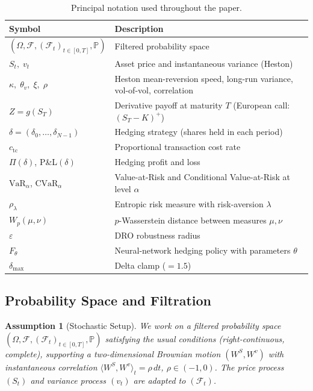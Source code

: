 \documentclass[11pt]{article}
\newtheorem{assumption}[theorem]{Assumption}
\newcommand{\F}{\mathcal{F}}
\newcommand{\PP}{\mathbb{P}}
\newcommand{\cvar}{\mathrm{CVaR}}
\newcommand{\VaR}{\mathrm{VaR}}
\begin{document}
\begin{table}[h]
\centering
\caption{Principal notation used throughout the paper.}
\label{tab:nomenclature}
\small
\begin{tabularx}{\textwidth}{@{}lX@{}}
\toprule
\textbf{Symbol} & \textbf{Description} \\
\midrule
$(\Omega,\F,(\F_t)_{t\in[0,T]},\PP)$ & Filtered probability space \\
$S_t,\;v_t$ & Asset price and instantaneous variance (Heston) \\
$\kappa,\;\theta_v,\;\xi,\;\rho$ & Heston mean-reversion speed, long-run variance, vol-of-vol, correlation \\
$Z = g(S_T)$ & Derivative payoff at maturity $T$ (European call: $(S_T-K)^+$) \\
$\delta = (\delta_0,\ldots,\delta_{N-1})$ & Hedging strategy (shares held in each period) \\
$c_{\mathrm{tc}}$ & Proportional transaction cost rate \\
$\Pi(\delta)$, P\&L$(\delta)$ & Hedging profit and loss \\
$\VaR_\alpha$, $\cvar_\alpha$ & Value-at-Risk and Conditional Value-at-Risk at level $\alpha$ \\
$\rho_\lambda$ & Entropic risk measure with risk-aversion $\lambda$ \\
$W_p(\mu,\nu)$ & $p$-Wasserstein distance between measures $\mu,\nu$ \\
$\varepsilon$ & DRO robustness radius \\
$F_\theta$ & Neural-network hedging policy with parameters $\theta$ \\
$\delta_{\max}$ & Delta clamp ($=1.5$) \\
\bottomrule
\end{tabularx}
\end{table}

\subsection{Probability Space and Filtration}

\begin{assumption}[Stochastic Setup]
\label{ass:prob_space}
We work on a filtered probability space $(\Omega, \F, (\F_t)_{t \in [0,T]}, \PP)$ satisfying the usual conditions (right-continuous, complete), supporting a two-dimensional Brownian motion $(W^S, W^v)$ with instantaneous correlation $\langle W^S, W^v \rangle_t = \rho\,dt$, $\rho \in (-1,0)$.  The price process $(S_t)$ and variance process $(v_t)$ are adapted to $(\F_t)$.
\end{assumption}
\end{document}
